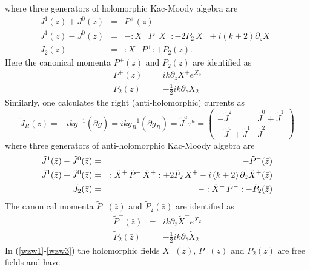 \documentclass[a4paper,12pt]{article}
\begin{document}
where three generators of holomorphic Kac-Moody algebra are
\begin{eqnarray}
J^{1}(z)+J^{0}(z) &=&P^{+}(z)  \label{wzw1} \\
J^{1}(z)-J^{0}(z) &=&-:X^{-}\,P^{+}X^{-}:-2P_{2}\,X^{-}+i\left( k+2\right)
\partial _{z}X^{-}  \label{wzw2} \\
J_{2}(z) &=&:X^{-}\,P^{+}:+P_{2}(z).  \label{wzw3}
\end{eqnarray}
Here the canonical momenta $P^{+}(z)$ and $P_{2}(z)$ are identified as
\begin{eqnarray}
P^{+}(z) &=&ik\partial _{z}X^{+}e^{X_{2}}  \nonumber \\
P_{2}(z) &=&-\frac{1}{2}ik\partial _{z}X_{2}  \label{canonical}
\end{eqnarray}
Similarly, one calculates the right (anti-holomorphic) currents as
\begin{equation}
\tilde{J}_{R}\left( \bar{z}\right) =-ikg^{-1}\left( \bar{\partial}g\right)
=ikg_{R}^{-1}\left( \bar{\partial}g_{R}\right) =\tilde{J}^{a}\tau
^{a}=\left(
\begin{array}{cc}
-\tilde{J}^{2} & \tilde{J}^{0}+\tilde{J}^{1} \\
-\tilde{J}^{0}+\tilde{J}^{1} & \tilde{J}^{2}
\end{array}
\right)  \label{antiholo}
\end{equation}
where three generators of anti-holomorphic Kac-Moody algebra are
\begin{eqnarray}
\tilde{J}^{1}(\bar{z})-\tilde{J}^{0}(\bar{z}) &=&-\tilde{P}^{-}(\bar{z})
\label{awzw1} \\
\tilde{J}^{1}(\bar{z})+\tilde{J}^{0}(\bar{z}) &=&:\tilde{X}^{+}\,\tilde{P}%
^{-}\,\tilde{X}^{+}:+2\tilde{P}_{2}\,\tilde{X}^{+}-i\left( k+2\right)
\partial _{\bar{z}}\tilde{X}^{+}(\bar{z})  \label{awzw2} \\
\tilde{J}_{2}(\bar{z}) &=&-:\tilde{X}^{+}\,\tilde{P}^{-}:-\tilde{P}_{2}(\bar{%
z})  \label{awzw3}
\end{eqnarray}
The canonical momenta $\tilde{P}^{-}(\bar{z})$ and $\tilde{P}_{2}(\bar{z})$
are identified as
\begin{eqnarray}
\tilde{P}^{-}(\bar{z}) &=&ik\partial _{\bar{z}}\tilde{X}^{-}e^{\tilde{X}_{2}}
\nonumber \\
\tilde{P}_{2}(\bar{z}) &=&-\frac{1}{2}ik\partial _{\bar{z}}\tilde{X}_{2}
\label{acanonical}
\end{eqnarray}
In (\ref{wzw1}-\ref{wzw3}) the holomorphic fields $X^{-}\left( z\right) $, $%
P^{+}\left( z\right) $ and $P_{2}\left( z\right) $ are free fields and have
\end{document}
